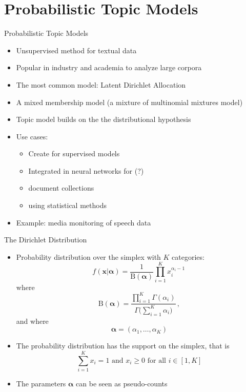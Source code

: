 \documentclass[10pt]{beamer}
\begin{document}
\section{Probabilistic Topic Models}
\frame{\sectionpage}

\begin{frame}{Probabilistic Topic Models}

\begin{itemize}
    \item Unsupervised method for {\color{uured} textual data}\pause
    \item Popular in industry and academia to {\color{uured} analyze large corpora}\pause
    \item The most common model: {\color{uured} Latent Dirichlet Allocation}
    \item A {\color{uured} mixed membership} model (a mixture of multinomial mixtures model)\pause
    \item Topic model builds on the the {\color{uured} distributional hypothesis}\pause
    \item Use cases:
    \begin{itemize}
        \item Create  for supervised models\pause
        \item Integrated in neural networks for  (?)\pause
        \item {} document collections\pause
        \item {} using statistical methods\pause
    \end{itemize}
    \item Example: \href{https://en.allears.ai/}{} media monitoring of speech data
\end{itemize}
\end{frame}



\begin{frame}{The Dirichlet Distribution}

\begin{itemize}
    \item Probability distribution over the simplex with $K$ categories:
\[
f({\boldsymbol {x} }| {\boldsymbol {\alpha }}) = {\frac {1}{\mathrm {B} ({\boldsymbol {\alpha }})}} \prod _{i=1}^{K}x_{i}^{\alpha _{i}-1}\,
\]
where
\[
{\displaystyle \mathrm {B} ({\boldsymbol {\alpha }})={\frac {\prod _{i=1}^{K}\Gamma (\alpha _{i})}{\Gamma {\bigl (}\sum _{i=1}^{K}\alpha _{i}{\bigr )}}}}\,,
\]
and where
\[
{\displaystyle {\boldsymbol {\alpha }}=(\alpha _{1},\ldots ,\alpha _{K})}
\]\pause
\item The probability distribution has the support on the simplex, that is
\[
    \sum_{i=1}^{K}x_{i}=1{\text{ and }}x_{i}\geq 0{\text{ for all }} i\in [1,K]
\]
\pause
\item The parameters ${\boldsymbol {\alpha }}$ can be seen as {\color{uured} pseudo-counts}
\end{itemize}
\end{frame}
\end{document}
